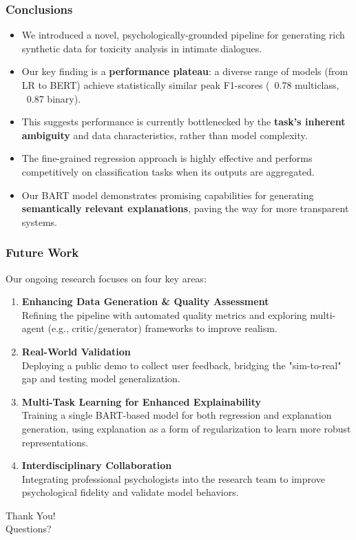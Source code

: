 \documentclass[aspectratio=169]{beamer}
\begin{document}
\begin{frame}
  \frametitle{Conclusions}
  
  \begin{itemize}
    \item We introduced a novel, psychologically-grounded pipeline for generating rich synthetic data for toxicity analysis in intimate dialogues.
    \pause
    \item Our key finding is a \textbf{performance plateau}: a diverse range of models (from LR to BERT) achieve statistically similar peak F1-scores (~0.78 multiclass, ~0.87 binary).
    \pause
    \item This suggests performance is currently bottlenecked by the \textbf{task's inherent ambiguity} and data characteristics, rather than model complexity.
    \pause
    \item The fine-grained regression approach is highly effective and performs competitively on classification tasks when its outputs are aggregated.
    \pause
    \item Our BART model demonstrates promising capabilities for generating \textbf{semantically relevant explanations}, paving the way for more transparent systems.
  \end{itemize}
\end{frame}

\begin{frame}
  \frametitle{Future Work}
  
  Our ongoing research focuses on four key areas:
  
  \begin{enumerate}
    \item \textbf{Enhancing Data Generation \& Quality Assessment} \\
    Refining the pipeline with automated quality metrics and exploring multi-agent (e.g., critic/generator) frameworks to improve realism.
    
    \item \textbf{Real-World Validation} \\
    Deploying a public demo to collect user feedback, bridging the "sim-to-real" gap and testing model generalization.
    
    \item \textbf{Multi-Task Learning for Enhanced Explainability} \\
    Training a single BART-based model for both regression and explanation generation, using explanation as a form of regularization to learn more robust representations.
    
    \item \textbf{Interdisciplinary Collaboration} \\
    Integrating professional psychologists into the research team to improve psychological fidelity and validate model behaviors.
  \end{enumerate}
\end{frame}

\begin{frame}
  \centering
  \Huge Thank You! \\
  \vspace{0.5cm}
  \normalsize Questions?
\end{frame}
\end{document}
